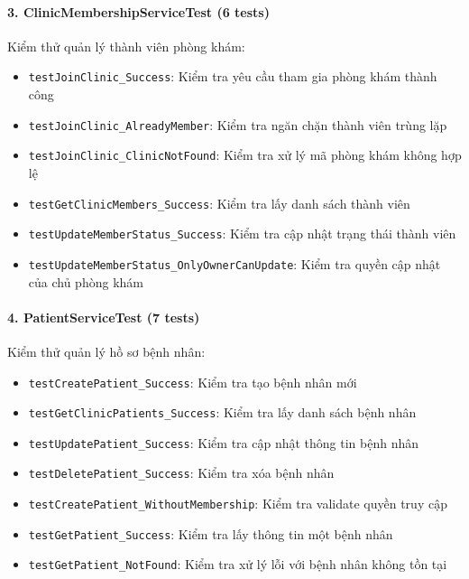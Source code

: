 \paragraph{3. ClinicMembershipServiceTest (6 tests)}
Kiểm thử quản lý thành viên phòng khám:
\begin{itemize}
    \item \texttt{testJoinClinic\_Success}: Kiểm tra yêu cầu tham gia phòng khám thành công
    \item \texttt{testJoinClinic\_AlreadyMember}: Kiểm tra ngăn chặn thành viên trùng lặp
    \item \texttt{testJoinClinic\_ClinicNotFound}: Kiểm tra xử lý mã phòng khám không hợp lệ
    \item \texttt{testGetClinicMembers\_Success}: Kiểm tra lấy danh sách thành viên
    \item \texttt{testUpdateMemberStatus\_Success}: Kiểm tra cập nhật trạng thái thành viên
    \item \texttt{testUpdateMemberStatus\_OnlyOwnerCanUpdate}: Kiểm tra quyền cập nhật của chủ phòng khám
\end{itemize}

\paragraph{4. PatientServiceTest (7 tests)}
Kiểm thử quản lý hồ sơ bệnh nhân:
\begin{itemize}
    \item \texttt{testCreatePatient\_Success}: Kiểm tra tạo bệnh nhân mới
    \item \texttt{testGetClinicPatients\_Success}: Kiểm tra lấy danh sách bệnh nhân
    \item \texttt{testUpdatePatient\_Success}: Kiểm tra cập nhật thông tin bệnh nhân
    \item \texttt{testDeletePatient\_Success}: Kiểm tra xóa bệnh nhân
    \item \texttt{testCreatePatient\_WithoutMembership}: Kiểm tra validate quyền truy cập
    \item \texttt{testGetPatient\_Success}: Kiểm tra lấy thông tin một bệnh nhân
    \item \texttt{testGetPatient\_NotFound}: Kiểm tra xử lý lỗi với bệnh nhân không tồn tại
\end{itemize}

